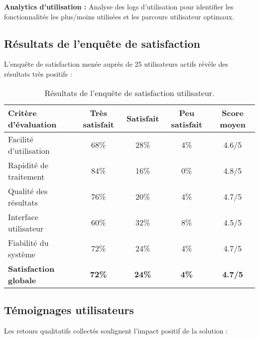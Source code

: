 \textbf{Analytics d'utilisation :} Analyse des logs d'utilisation pour identifier les fonctionnalités les plus/moins utilisées et les parcours utilisateur optimaux.

\subsection{Résultats de l'enquête de satisfaction}

L'enquête de satisfaction menée auprès de 25 utilisateurs actifs révèle des résultats très positifs :

\begin{table}[h]
    \centering
    \begin{tabular}{|l|c|c|c|c|}
        \hline
        \textbf{Critère d'évaluation} & \textbf{Très satisfait} & \textbf{Satisfait} & \textbf{Peu satisfait} & \textbf{Score moyen} \\ \hline
        Facilité d'utilisation        & 68\%                    & 28\%               & 4\%                    & 4.6/5                \\ \hline
        Rapidité de traitement        & 84\%                    & 16\%               & 0\%                    & 4.8/5                \\ \hline
        Qualité des résultats         & 76\%                    & 20\%               & 4\%                    & 4.7/5                \\ \hline
        Interface utilisateur         & 60\%                    & 32\%               & 8\%                    & 4.5/5                \\ \hline
        Fiabilité du système          & 72\%                    & 24\%               & 4\%                    & 4.7/5                \\ \hline
        \textbf{Satisfaction globale} & \textbf{72\%}           & \textbf{24\%}      & \textbf{4\%}           & \textbf{4.7/5}       \\ \hline
    \end{tabular}
    \caption{Résultats de l'enquête de satisfaction utilisateur.}
    \label{tab:satisfaction-utilisateur}
\end{table}

\subsection{Témoignages utilisateurs}

Les retours qualitatifs collectés soulignent l'impact positif de la solution :


